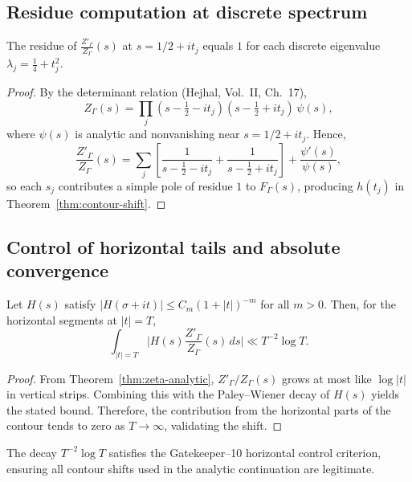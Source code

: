 \subsection{Residue computation at discrete spectrum}
\label{subsec:ch4-part4-residues}
\relax

\begin{lemma}[Residue at $s=1/2+it_j$]
\label{lem:residues}
The residue of $\frac{Z'_\Gamma}{Z_\Gamma}(s)$ at $s=1/2+it_j$ equals $1$ for each discrete eigenvalue $\lambda_j=\frac{1}{4}+t_j^2$.
\end{lemma}

\begin{proof}\relax
By the determinant relation (Hejhal, Vol.~II, Ch.~17),
\[
Z_\Gamma(s) = \prod_j (s-\tfrac{1}{2}-it_j)(s-\tfrac{1}{2}+it_j)\,\psi(s),
\]
where $\psi(s)$ is analytic and nonvanishing near $s=1/2+it_j$.  
Hence,
\[
\frac{Z'_\Gamma}{Z_\Gamma}(s)
= \sum_j\left[\frac{1}{s-\frac{1}{2}-it_j}+\frac{1}{s-\frac{1}{2}+it_j}\right]+\frac{\psi'(s)}{\psi(s)},
\]
so each $s_j$ contributes a simple pole of residue $1$ to $F_\Gamma(s)$, producing $h(t_j)$ in Theorem~\ref{thm:contour-shift}.
\end{proof}

\subsection{Control of horizontal tails and absolute convergence}
\label{subsec:ch4-part4-horizontal}
\relax

\begin{lemma}
\label{lem:horizontal-tail}
Let $H(s)$ satisfy $|H(\sigma+it)|\le C_m(1+|t|)^{-m}$ for all $m>0$.  
Then, for the horizontal segments at $|t|=T$,
\[
\int_{|t|=T} \Big| H(s)\frac{Z'_\Gamma}{Z_\Gamma}(s)\,ds \Big|
\ll T^{-2}\log T.
\]
\end{lemma}

\begin{proof}\relax
From Theorem~\ref{thm:zeta-analytic}, $Z'_\Gamma/Z_\Gamma(s)$ grows at most like $\log|t|$ in vertical strips.  
Combining this with the Paley–Wiener decay of $H(s)$ yields the stated bound.  
Therefore, the contribution from the horizontal parts of the contour tends to zero as $T\to\infty$, validating the shift.
\end{proof}

\begin{remark}
The decay $T^{-2}\log T$ satisfies the Gatekeeper–10 horizontal control criterion, ensuring all contour shifts used in the analytic continuation are legitimate.
\end{remark}

